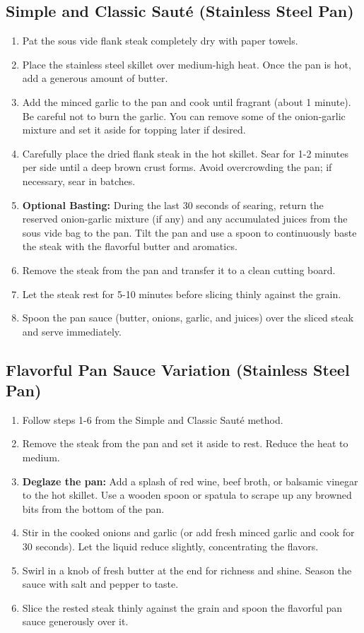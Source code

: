 \documentclass[openany, 12pt]{article}
\begin{document}
\subsection{Simple and Classic Sauté (Stainless Steel Pan)}
\begin{enumerate}
	\item Pat the sous vide flank steak completely dry with paper towels.
	\item Place the stainless steel skillet over medium-high heat. Once the pan
	      is hot, add a generous amount of butter.
	\item Add the minced garlic to the pan and cook until fragrant (about 1
	      minute). Be careful not to burn the garlic. You can remove some of the
	      onion-garlic mixture and set it aside for topping later if desired.
	\item Carefully place the dried flank steak in the hot skillet. Sear for 1-2
	      minutes per side until a deep brown crust forms. Avoid overcrowding the
	      pan; if necessary, sear in batches.
	\item \textbf{Optional Basting:} During the last 30 seconds of searing,
	      return the reserved onion-garlic mixture (if any) and any accumulated
	      juices from the sous vide bag to the pan. Tilt the pan and use a spoon
	      to continuously baste the steak with the flavorful butter and aromatics.
	\item Remove the steak from the pan and transfer it to a clean cutting board.
	\item Let the steak rest for 5-10 minutes before slicing thinly against the grain.
	\item Spoon the pan sauce (butter, onions, garlic, and juices) over the
	      sliced steak and serve immediately.
\end{enumerate}

\subsection{Flavorful Pan Sauce Variation (Stainless Steel Pan)}
\begin{enumerate}
	\item Follow steps 1-6 from the Simple and Classic Sauté method.
	\item Remove the steak from the pan and set it aside to rest. Reduce the
	      heat to medium.
	\item \textbf{Deglaze the pan:} Add a splash of red wine, beef broth, or
	      balsamic vinegar to the hot skillet. Use a wooden spoon or spatula to
	      scrape up any browned bits from the bottom of the pan. \item Stir in the
	      cooked onions and garlic (or add fresh minced garlic and cook for 30
	      seconds). Let the liquid reduce slightly, concentrating the flavors.
	\item Swirl in a knob of fresh butter at the end for richness and shine.
	      Season the sauce with salt and pepper to taste. \item Slice the rested
	      steak thinly against the grain and spoon the flavorful pan sauce
	      generously over it. \end{enumerate}
\end{document}
